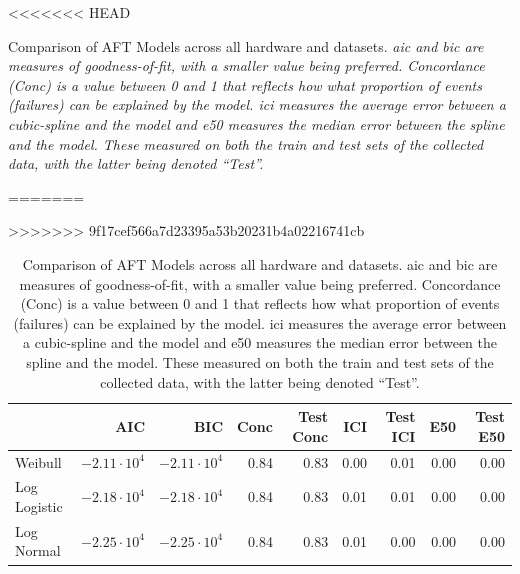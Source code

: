 \documentclass[sn-mathphys-num]{sn-jnl}%
\newcommand{\cm}[1]{\textit{{\color{blue}#1}}}
\begin{document}
\begin{table}
\centering
<<<<<<< HEAD
\caption{Comparison of AFT Models across all hardware and datasets.
\cm{\acrshort{aic} and \acrshort{bic} are measures of goodness-of-fit, with a smaller value being preferred.
Concordance (Conc) is a value between 0 and 1 that reflects how what proportion of events (failures) can be explained by the model.
\acrshort{ici} measures the average error between a cubic-spline and the model and \acrshort{e50} measures the median error between the spline and the model.
These measured on both the train and test sets of the collected data, with the latter being denoted ``Test''.}}
\label{tab:aft_results}
=======
\caption{Comparison of AFT Models across all hardware and datasets. \acrshort{aic} and \acrshort{bic} are measures of goodness-of-fit, with a smaller value being preferred. Concordance (Conc) is a value between 0 and 1 that reflects how what proportion of events (failures) can be explained by the model. \acrshort{ici} measures the average error between a cubic-spline and the model and \acrshort{e50} measures the median error between the spline and the model. These measured on both the train and test sets of the collected data, with the latter being denoted ``Test''.}
\label{tab:combined}
>>>>>>> 9f17cef566a7d23395a53b20231b4a02216741cb
\begin{tabular}{lrrrrrrrr}
\toprule
             & AIC              & BIC & Conc & Test Conc & ICI & Test ICI & E50 & Test E50 \\
\midrule
Weibull      & $-2.11\cdot10^4$ & $-2.11\cdot10^4$ & 0.84 & 0.83 & 0.00 & 0.01 & 0.00 & 0.00 \\
Log Logistic & $-2.18\cdot10^4$ & $-2.18\cdot10^4$ & 0.84 & 0.83 & 0.01 & 0.01 & 0.00 & 0.00 \\
Log Normal   & $-2.25\cdot10^4$ & $-2.25\cdot10^4$ & 0.84 & 0.83 & 0.01 & 0.00 & 0.00 & 0.00 \\
\bottomrule
\end{tabular}
\end{table}
\end{document}
